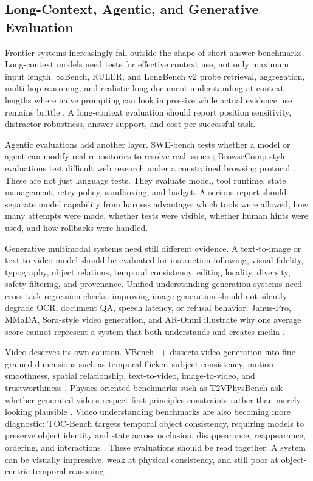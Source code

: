 \subsection{Long-Context, Agentic, and Generative Evaluation}
Frontier systems increasingly fail outside the shape of short-answer benchmarks. Long-context models need tests for effective context use, not only maximum input length. $\infty$Bench, RULER, and LongBench v2 probe retrieval, aggregation, multi-hop reasoning, and realistic long-document understanding at context lengths where naive prompting can look impressive while actual evidence use remains brittle \cite{zhang2024inftybench,hsieh2024ruler,bai2024longbenchv2}. A long-context evaluation should report position sensitivity, distractor robustness, answer support, and cost per successful task.

Agentic evaluations add another layer. SWE-bench tests whether a model or agent can modify real repositories to resolve real issues \cite{jimenez2023swebench}; BrowseComp-style evaluations test difficult web research under a constrained browsing protocol \cite{openai2025browsecomp}. These are not just language tests. They evaluate model, tool runtime, state management, retry policy, sandboxing, and budget. A serious report should separate model capability from harness advantage: which tools were allowed, how many attempts were made, whether tests were visible, whether human hints were used, and how rollbacks were handled.

Generative multimodal systems need still different evidence. A text-to-image or text-to-video model should be evaluated for instruction following, visual fidelity, typography, object relations, temporal consistency, editing locality, diversity, safety filtering, and provenance. Unified understanding-generation systems need cross-task regression checks: improving image generation should not silently degrade OCR, document QA, speech latency, or refusal behavior. Janus-Pro, MMaDA, Sora-style video generation, and AR-Omni illustrate why one average score cannot represent a system that both understands and creates media \cite{chen2025januspro,yang2025mmada,openai2024sora,cheng2026aromni}.

Video deserves its own caution. VBench++ dissects video generation into fine-grained dimensions such as temporal flicker, subject consistency, motion smoothness, spatial relationship, text-to-video, image-to-video, and trustworthiness \cite{huang2024vbenchpp}. Physics-oriented benchmarks such as T2VPhysBench ask whether generated videos respect first-principles constraints rather than merely looking plausible \cite{guo2025t2vphysbench}. Video understanding benchmarks are also becoming more diagnostic: TOC-Bench targets temporal object consistency, requiring models to preserve object identity and state across occlusion, disappearance, reappearance, ordering, and interactions \cite{chen2026tocbench}. These evaluations should be read together. A system can be visually impressive, weak at physical consistency, and still poor at object-centric temporal reasoning.

